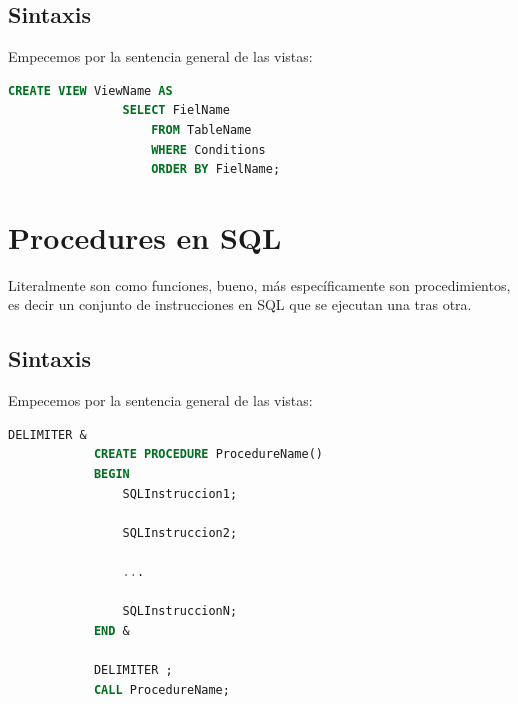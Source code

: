 \documentclass[12pt, fleqn]{article}                             %
\begin{document}
    \subsection{Sintaxis}

        Empecemos por la sentencia general de las vistas:

        \begin{lstlisting}[language=SQL, gobble=12]
            CREATE VIEW ViewName AS
                SELECT FielName
                    FROM TableName
                    WHERE Conditions
                    ORDER BY FielName; 
        \end{lstlisting}





\section{Procedures en SQL}

    Literalmente son como funciones, bueno, más específicamente son procedimientos,
    es decir un conjunto de instrucciones en SQL que se ejecutan una tras otra.


    \subsection{Sintaxis}

        Empecemos por la sentencia general de las vistas:

        \begin{lstlisting}[language=SQL, gobble=12]
            DELIMITER &
            CREATE PROCEDURE ProcedureName()
            BEGIN
                SQLInstruccion1;

                SQLInstruccion2;

                ...

                SQLInstruccionN;
            END &

            DELIMITER ;
            CALL ProcedureName;
        \end{lstlisting}
       
\end{document}
